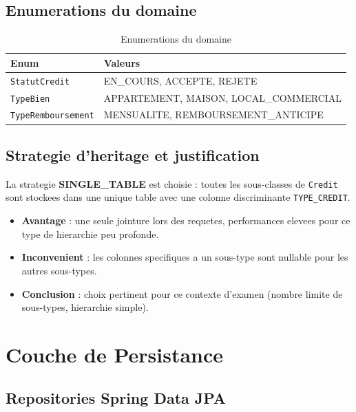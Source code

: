 \documentclass[12pt,a4paper]{report}
\begin{document}
\section{Enumerations du domaine}

\begin{table}[h!]
\centering
\begin{tabularx}{\linewidth}{l X}
\toprule
\textbf{Enum} & \textbf{Valeurs} \\
\midrule
\texttt{StatutCredit}      & EN\_COURS, ACCEPTE, REJETE \\
\texttt{TypeBien}          & APPARTEMENT, MAISON, LOCAL\_COMMERCIAL \\
\texttt{TypeRemboursement} & MENSUALITE, REMBOURSEMENT\_ANTICIPE \\
\bottomrule
\end{tabularx}
\caption{Enumerations du domaine}
\end{table}

\section{Strategie d'heritage et justification}

La strategie \textbf{SINGLE\_TABLE} est choisie : toutes les sous-classes de
\texttt{Credit} sont stockees dans une unique table avec une colonne discriminante
\texttt{TYPE\_CREDIT}.

\begin{itemize}
    \item \textbf{Avantage} : une seule jointure lors des requetes, performances
          elevees pour ce type de hierarchie peu profonde.
    \item \textbf{Inconvenient} : les colonnes specifiques a un sous-type sont
          nullable pour les autres sous-types.
    \item \textbf{Conclusion} : choix pertinent pour ce contexte d'examen
          (nombre limite de sous-types, hierarchie simple).
\end{itemize}

\chapter{Couche de Persistance}

\section{Repositories Spring Data JPA}
\end{document}
